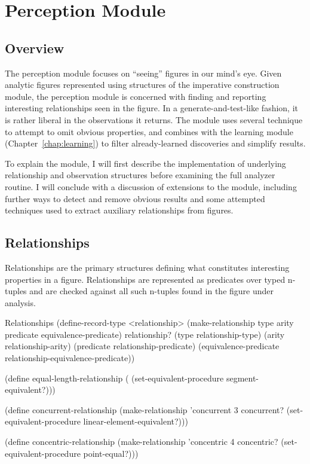 \chapter{Perception Module}
\label{chap:observer}


\section{Overview}

The perception module focuses on ``seeing'' figures in our mind's eye.
Given analytic figures represented using structures of the imperative
construction module, the perception module is concerned with finding
and reporting interesting relationships seen in the figure. In a
generate-and-test-like fashion, it is rather liberal in the
observations it returns. The module uses several technique to attempt
to omit obvious properties, and combines with the learning module
(Chapter~\ref{chap:learning}) to filter already-learned discoveries
and simplify results.

To explain the module, I will first describe the implementation of
underlying relationship and observation structures before examining
the full analyzer routine. I will conclude with a discussion of
extensions to the module, including further ways to detect and remove
obvious results and some attempted techniques used to extract
auxiliary relationships from figures.

\section{Relationships}

Relationships are the primary structures defining what constitutes
interesting properties in a figure. Relationships are represented as
predicates over typed n-tuples and are checked against all such
n-tuples found in the figure under analysis.

\begin{code-listing}
[label=relationship-structure]
{Relationships}
(define-record-type <relationship>
  (make-relationship type arity predicate equivalence-predicate)
  relationship?
  (type relationship-type)
  (arity relationship-arity)
  (predicate relationship-predicate)
  (equivalence-predicate relationship-equivalence-predicate))

(define equal-length-relationship
  (%
                      (set-equivalent-procedure segment-equivalent?)))

(define concurrent-relationship
  (make-relationship 'concurrent 3 concurrent?
                      (set-equivalent-procedure linear-element-equivalent?)))

(define concentric-relationship
  (make-relationship 'concentric 4 concentric?
                      (set-equivalent-procedure point-equal?)))
\end{code-listing}

